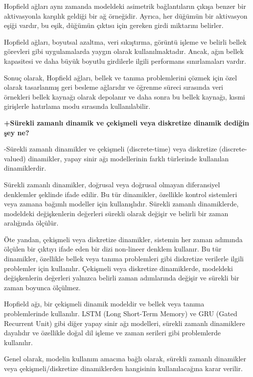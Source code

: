 \documentclass[11pt]{article}
\begin{document}
Hopfield ağları aynı zamanda modeldeki asimetrik bağlantıların çıkışa benzer bir aktivasyonla karşılık geldiği bir ağ örneğidir. Ayrıca, her düğümün bir aktivasyon eşiği vardır, bu eşik, düğümün çıktısı için gereken girdi miktarını belirler.

Hopfield ağları, boyutsal azaltma, veri sıkıştırma, görüntü işleme ve belirli bellek görevleri gibi uygulamalarda yaygın olarak kullanılmaktadır. Ancak, ağın bellek kapasitesi ve daha büyük boyutlu girdilerle ilgili performans sınırlamaları vardır.

Sonuç olarak, Hopfield ağları, bellek ve tanıma problemlerini çözmek için özel olarak tasarlanmış geri besleme ağlarıdır ve öğrenme süreci sırasında veri örnekleri bellek kaynağı olarak depolanır ve daha sonra bu bellek kaynağı, kısmi girişlerle hatırlama modu sırasında kullanılabilir.

   \textbf{+Sürekli zamanlı dinamik ve çekişmeli veya diskretize dinamik dediğin şey ne?}

  -Sürekli zamanlı dinamikler ve çekişmeli (discrete-time) veya diskretize (discrete-valued) dinamikler, yapay sinir ağı modellerinin farklı türlerinde kullanılan dinamiklerdir.

Sürekli zamanlı dinamikler, doğrusal veya doğrusal olmayan diferansiyel denklemler şeklinde ifade edilir. Bu tür dinamikler, özellikle kontrol sistemleri veya zamana bağımlı modeller için kullanışlıdır. Sürekli zamanlı dinamiklerde, modeldeki değişkenlerin değerleri sürekli olarak değişir ve belirli bir zaman aralığında ölçülür.

Öte yandan, çekişmeli veya diskretize dinamikler, sistemin her zaman adımında ölçülen bir çıktıyı ifade eden bir dizi non-lineer denklem kullanır. Bu tür dinamikler, özellikle bellek veya tanıma problemleri gibi diskretize verilerle ilgili problemler için kullanılır. Çekişmeli veya diskretize dinamiklerde, modeldeki değişkenlerin değerleri yalnızca belirli zaman adımlarında değişir ve sürekli bir zaman boyunca ölçülmez.

Hopfield ağı, bir çekişmeli dinamik modeldir ve bellek veya tanıma problemlerinde kullanılır. LSTM (Long Short-Term Memory) ve GRU (Gated Recurrent Unit) gibi diğer yapay sinir ağı modelleri, sürekli zamanlı dinamiklere dayalıdır ve özellikle doğal dil işleme ve zaman serileri gibi problemlerde kullanılır.

Genel olarak, modelin kullanım amacına bağlı olarak, sürekli zamanlı dinamikler veya çekişmeli/diskretize dinamiklerden hangisinin kullanılacağına karar verilir.
\end{document}

